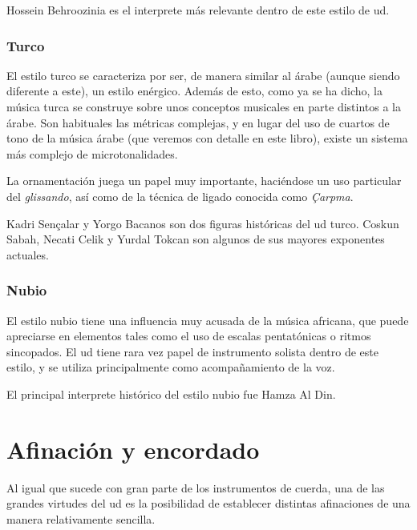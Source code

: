 Hossein Behroozinia es el interprete más relevante dentro de este estilo de ud.


\subsubsection{Turco}

El estilo turco se caracteriza por ser, de manera similar al árabe (aunque siendo diferente a este), un estilo enérgico. Además de esto, como ya se ha dicho, la música turca se construye sobre unos conceptos musicales en parte distintos a la árabe. Son habituales las métricas complejas, y en lugar del uso de cuartos de tono de la música árabe (que veremos con detalle en este libro), existe un sistema más complejo de microtonalidades.

La ornamentación juega un papel muy importante, haciéndose un uso particular del \emph{glissando}, así como de la técnica de ligado conocida como \emph{Çarpma}.

Kadri Sençalar y Yorgo Bacanos son dos figuras históricas del ud turco. Coskun Sabah, Necati Celik y Yurdal Tokcan son algunos de sus mayores exponentes actuales.


\subsubsection{Nubio}

El estilo nubio tiene una influencia muy acusada de la música africana, que puede apreciarse en elementos tales como el uso de escalas pentatónicas o ritmos sincopados. El ud tiene rara vez papel de instrumento solista dentro de este estilo, y se utiliza principalmente como acompañamiento de la voz.

El principal interprete histórico del estilo nubio fue Hamza Al Din.


\section{Afinación y encordado}

Al igual que sucede con gran parte de los instrumentos de cuerda, una de las grandes virtudes del ud es la posibilidad de establecer distintas afinaciones de una manera relativamente sencilla.

